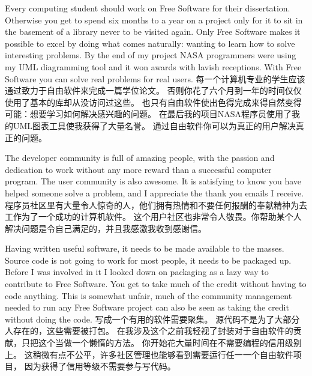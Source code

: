 Every computing student should work on Free Software for their dissertation.
Otherwise you get to spend six months to a year on a project only for it to sit
in the basement of a library never to be visited again. Only Free Software makes
it possible to excel by doing what comes naturally: wanting to learn how to
solve interesting problems. By the end of my project NASA programmers were using
my UML diagramming tool and it won awards with lavish receptions. With Free
Software you can solve real problems for real users.
每一个计算机专业的学生应该通过致力于自由软件来完成一篇学位论文。
否则你花了六个月到一年的时间仅仅使用了基本的库却从没访问过这些。
也只有自由软件使出色得完成来得自然变得可能：想要学习如何解决感兴趣的问题。
在最后我的项目NASA程序员使用了我的UML图表工具使我获得了大量名誉。
通过自由软件你可以为真正的用户解决真正的问题。

The developer community is full of amazing people, with the passion and
dedication to work without any more reward than a successful computer program.
The user community is also awesome. It is satisfying to know you have helped
someone solve a problem, and I appreciate the thank you emails I receive.
程序员社区里有大量令人惊奇的人，他们拥有热情和不要任何报酬的奉献精神为去工作为了一个成功的计算机软件。
这个用户社区也非常令人敬畏。你帮助某个人解决问题是令自己满足的，并且我感激我收到感谢信。

Having written useful software, it needs to be made available to the masses.
Source code is not going to work for most people, it needs to be packaged up.
Before I was involved in it I looked down on packaging as a lazy way to
contribute to Free Software. You get to take much of the credit without having
to code anything. This is somewhat unfair, much of the community management
needed to run any Free Software project can also be seen as taking the credit
without doing the code.
写成一个有用的软件需要聚集。
源代码不是为了大部分人存在的，这些需要被打包。
在我涉及这个之前我轻视了封装对于自由软件的贡献，只把这个当做一个懒惰的方法。
你开始花大量时间在不需要编程的信用级别上。
这稍微有点不公平，许多社区管理也能够看到需要运行任一一个自由软件项目，
因为获得了信用等级不需要参与写代码。

